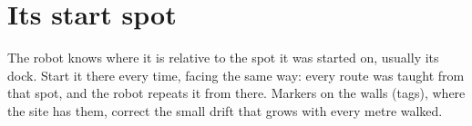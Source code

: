 \section{Its start spot}

The robot knows where it is relative to the spot it was started on, usually its dock. Start it
there every time, facing the same way: every route was taught from that spot, and the robot
repeats it from there. Markers on the walls (tags), where the site has them, correct the small
drift that grows with every metre walked.
